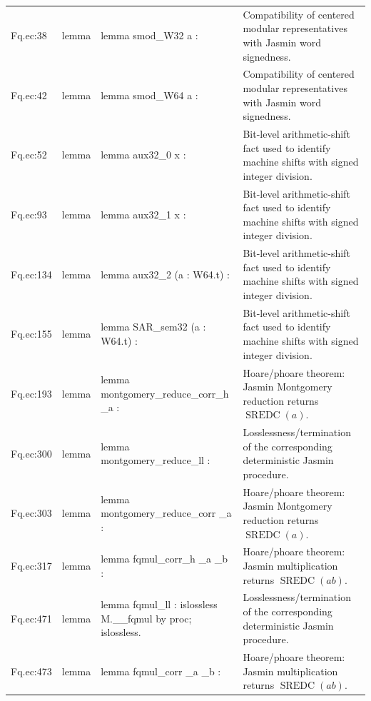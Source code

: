 \documentclass[10pt]{article}
\begin{document}
\begin{longtable}{L{0.11\textwidth}L{0.05\textwidth}L{0.38\textwidth}L{0.42\textwidth}}
Fq.\allowbreak{}ec:\allowbreak{}38 & lemma & {\ttfamily\scriptsize lemma smod\_W32 a :} & Compatibility of centered modular representatives with Jasmin word signedness. \\
Fq.\allowbreak{}ec:\allowbreak{}42 & lemma & {\ttfamily\scriptsize lemma smod\_W64 a :} & Compatibility of centered modular representatives with Jasmin word signedness. \\
Fq.\allowbreak{}ec:\allowbreak{}52 & lemma & {\ttfamily\scriptsize lemma aux32\_0 x :} & Bit-level arithmetic-shift fact used to identify machine shifts with signed integer division. \\
Fq.\allowbreak{}ec:\allowbreak{}93 & lemma & {\ttfamily\scriptsize lemma aux32\_1 x :} & Bit-level arithmetic-shift fact used to identify machine shifts with signed integer division. \\
Fq.\allowbreak{}ec:\allowbreak{}134 & lemma & {\ttfamily\scriptsize lemma aux32\_2 (a : W64.t) :} & Bit-level arithmetic-shift fact used to identify machine shifts with signed integer division. \\
Fq.\allowbreak{}ec:\allowbreak{}155 & lemma & {\ttfamily\scriptsize lemma SAR\_sem32 (a : W64.t) :} & Bit-level arithmetic-shift fact used to identify machine shifts with signed integer division. \\
Fq.\allowbreak{}ec:\allowbreak{}193 & lemma & {\ttfamily\scriptsize lemma montgomery\_reduce\_corr\_h \_a :} & Hoare/phoare theorem: Jasmin Montgomery reduction returns $\operatorname{SREDC}(a)$. \\
Fq.\allowbreak{}ec:\allowbreak{}300 & lemma & {\ttfamily\scriptsize lemma montgomery\_reduce\_ll :} & Losslessness/termination of the corresponding deterministic Jasmin procedure. \\
Fq.\allowbreak{}ec:\allowbreak{}303 & lemma & {\ttfamily\scriptsize lemma montgomery\_reduce\_corr \_a :} & Hoare/phoare theorem: Jasmin Montgomery reduction returns $\operatorname{SREDC}(a)$. \\
Fq.\allowbreak{}ec:\allowbreak{}317 & lemma & {\ttfamily\scriptsize lemma fqmul\_corr\_h \_a \_b :} & Hoare/phoare theorem: Jasmin multiplication returns $\operatorname{SREDC}(ab)$. \\
Fq.\allowbreak{}ec:\allowbreak{}471 & lemma & {\ttfamily\scriptsize lemma fqmul\_ll : islossless M.\_\_fqmul by proc; islossless.} & Losslessness/termination of the corresponding deterministic Jasmin procedure. \\
Fq.\allowbreak{}ec:\allowbreak{}473 & lemma & {\ttfamily\scriptsize lemma fqmul\_corr \_a \_b :} & Hoare/phoare theorem: Jasmin multiplication returns $\operatorname{SREDC}(ab)$. \\

\end{longtable}
\end{document}
